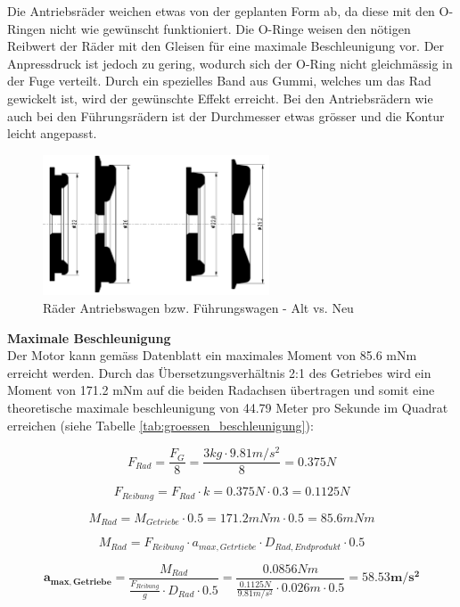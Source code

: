 \documentclass[../../main.tex]{subfiles}
\begin{document}
Die Antriebsräder weichen etwas von der geplanten Form ab, da diese mit den O-Ringen nicht wie gewünscht funktioniert. Die O-Ringe weisen den nötigen Reibwert der Räder mit den Gleisen für eine maximale Beschleunigung vor. Der Anpressdruck ist jedoch zu gering, wodurch sich der O-Ring nicht gleichmässig in der Fuge verteilt. Durch ein spezielles Band aus Gummi, welches um das Rad gewickelt ist, wird der gewünschte Effekt erreicht. Bei den Antriebsrädern wie auch bei den Führungsrädern ist der Durchmesser etwas grösser und die Kontur leicht angepasst.\\

\begin{figure}[H]
  \centering
  \includegraphics[width=0.6\textwidth]{wagenraeder.PNG}
  \caption {Räder Antriebswagen bzw. Führungswagen - Alt vs. Neu}
  \label{fig:raeder}
\end{figure}

\newpage

\textbf{Maximale Beschleunigung}\\
Der Motor kann gemäss Datenblatt ein maximales Moment von 85.6 mNm erreicht werden. Durch das Übersetzungsverhältnis 2:1 des Getriebes wird ein Moment von 171.2 mNm auf die beiden Radachsen übertragen und somit eine theoretische maximale beschleunigung von 44.79 Meter pro Sekunde im Quadrat erreichen (siehe Tabelle \ref{tab:groessen_beschleunigung}):

$$F_{Rad}=\frac{F_{G}}{8}=\frac{3kg \cdot 9.81m/s^2}{8}=0.375N$$

$$F_{Reibung}=F_{Rad} \cdot k=0.375N \cdot 0.3=0.1125N$$

$$M_{Rad}=M_{Getriebe} \cdot 0.5= 171.2 mNm \cdot 0.5 = 85.6 mNm$$

$$M_{Rad}=F_{Reibung} \cdot a_{max, Getrtiebe} \cdot D_{Rad,Endprodukt} \cdot 0.5$$

$$\boldsymbol{a_{max, Getriebe}}=\frac{M_{Rad}}{\frac{F_{Reibung}}{g} \cdot D_{Rad} \cdot 0.5}=\frac{0.0856Nm}{\frac{0.1125N}{9.81m/s^2} \cdot 0.026m \cdot 0.5}=\boldsymbol{58.53m/s^2}$$\\
\end{document}
